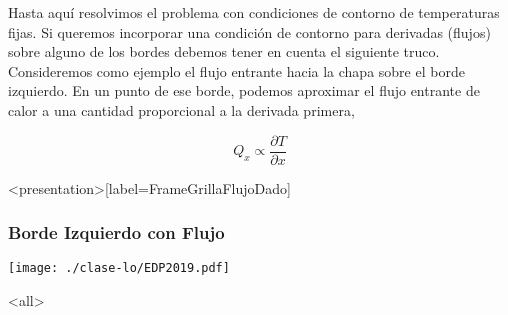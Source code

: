 
Hasta aquí resolvimos el problema con condiciones de contorno de 
temperaturas fijas. Si queremos incorporar una condición de 
contorno para derivadas (flujos) sobre alguno de los bordes
debemos tener en cuenta el siguiente truco. Consideremos como 
ejemplo el flujo entrante hacia la chapa sobre el borde 
izquierdo. En un punto de ese borde, podemos aproximar el flujo entrante
de calor a una cantidad proporcional a la derivada primera,

\begin{equation}\label{EqFluxPartialT}
  Q_{x} \propto  \dfrac{\partial T }{\partial x} 
\end{equation}

\mode*

\begin{frame}<presentation>[label=FrameGrillaFlujoDado]
  \frametitle{Borde Izquierdo con Flujo}

  \texttt{[image: ./clase-lo/EDP2019.pdf]}

\end{frame}

\mode<all>
